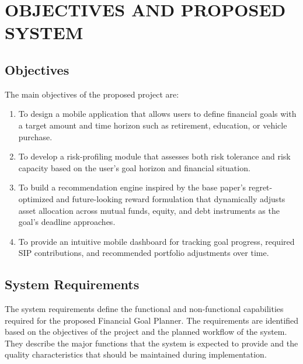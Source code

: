 \chapter{\uppercase{Objectives and Proposed System}}

\section{Objectives}
The main objectives of the proposed project are:
\begin{enumerate}
	\item To design a mobile application that allows users to define financial goals with a target amount and time horizon such as retirement, education, or vehicle purchase.
	\item To develop a risk-profiling module that assesses both risk tolerance and risk capacity based on the user's goal horizon and financial situation.
	\item To build a recommendation engine inspired by the base paper's regret-optimized and future-looking reward formulation that dynamically adjusts asset allocation across mutual funds, equity, and debt instruments as the goal's deadline approaches.
	\item To provide an intuitive mobile dashboard for tracking goal progress, required SIP contributions, and recommended portfolio adjustments over time.
\end{enumerate}

\section{System Requirements}

The system requirements define the functional and non-functional
capabilities required for the proposed Financial Goal Planner. The
requirements are identified based on the objectives of the project and
the planned workflow of the system. They describe the major functions
that the system is expected to provide and the quality characteristics
that should be maintained during implementation.

